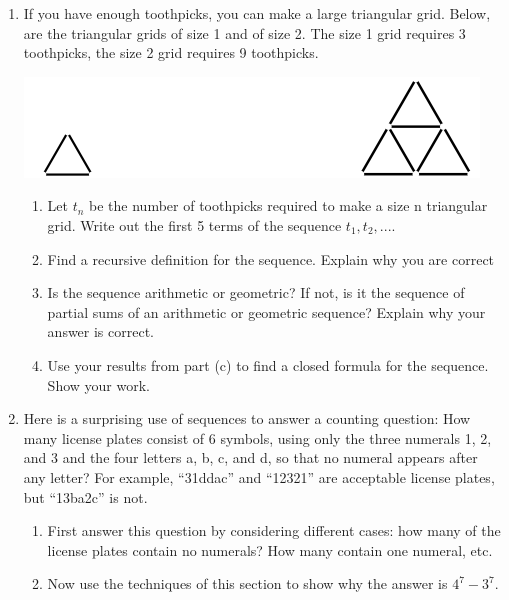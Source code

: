 \documentclass[11pt, a4paper]{article}
\newcommand\setItemNumber[1]{\setcounter{enumi}{\numexpr#1-1\relax}}
\begin{document}
\begin{enumerate}
            \setItemNumber{13}
            \item If you have enough toothpicks, you can make a large triangular grid. Below, are the triangular grids of size 1 and of size 2. The size 1 grid requires 3 toothpicks, the size 2 grid requires 9 toothpicks.

            \begin{center}
            \includegraphics[width=.5\textwidth]{hw6_graphic2}
            \end{center}

                \begin{enumerate}
                    \item Let $t_n$ be the number of toothpicks required to make a size n triangular grid. Write out the first 5 terms of the sequence $t_1, t_2, ...$.
                    \item Find a recursive definition for the sequence. Explain why you are correct
                    \item Is the sequence arithmetic or geometric? If not, is it the sequence of partial sums of an arithmetic or geometric sequence? Explain why your answer is correct.
                    \item Use your results from part (c) to find a closed formula for the sequence. Show your work.
                \end{enumerate}

            \setItemNumber{15}
            \item Here is a surprising use of sequences to answer a counting question: How many license plates consist of 6 symbols, using only the three numerals 1, 2, and 3 and the four letters a, b, c, and d, so that no numeral appears after any letter? For example, “31ddac” and “12321” are acceptable license plates, but “13ba2c” is not.
                \begin{enumerate}
                    \item First answer this question by considering different cases: how many of the license plates contain no numerals? How many contain one numeral, etc.
                    \item Now use the techniques of this section to show why the answer is $4^7 - 3^7$.

                \end{enumerate}

        \end{enumerate}
	
	
		
\end{document}
